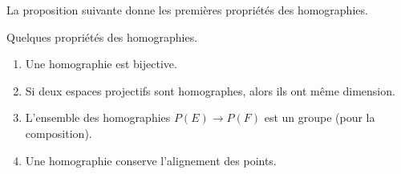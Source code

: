 La proposition suivante donne les premières propriétés des homographies.
\begin{proposition}     \label{PROPooGVYXooDIiIbW}
    Quelques propriétés des homographies.
    \begin{enumerate}
        \item       \label{ITEMooTIONooSKjfny}
            Une homographie est bijective.
        \item
            Si deux espaces projectifs sont homographes, alors ils ont même dimension.
        \item       \label{ITEMooIZAPooNxEigb}
            L'ensemble des homographies \( P(E)\to P(F)\) est un groupe (pour la composition).
        \item
            Une homographie conserve l'alignement des points.
    \end{enumerate}
\end{proposition}


